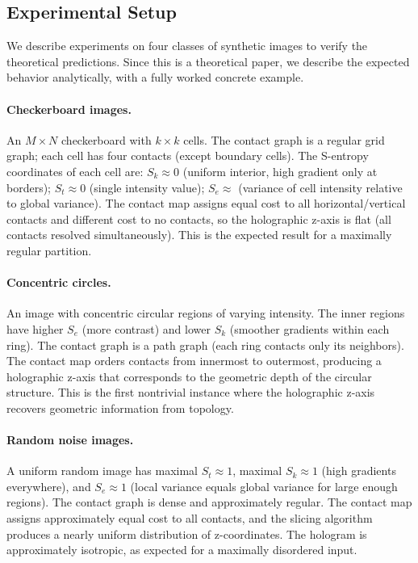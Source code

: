 \documentclass[twocolumn]{article}
\theoremstyle{plain}
\theoremstyle{definition}
\newcommand{\Sk}{S_k}
\newcommand{\St}{S_t}
\newcommand{\Se}{S_e}
\begin{document}
\subsection{Experimental Setup}

We describe experiments on four classes of synthetic images to verify the
theoretical predictions. Since this is a theoretical paper, we describe the
expected behavior analytically, with a fully worked concrete example.

\paragraph{Checkerboard images.} An $M \times N$ checkerboard with $k \times k$
cells. The contact graph is a regular grid graph; each cell has four contacts
(except boundary cells). The S-entropy coordinates of each cell are:
$\Sk \approx 0$ (uniform interior, high gradient only at borders); $\St \approx 0$
(single intensity value); $\Se \approx$ (variance of cell intensity relative to
global variance). The contact map assigns equal cost to all horizontal/vertical
contacts and different cost to no contacts, so the holographic z-axis is flat
(all contacts resolved simultaneously). This is the expected result for a
maximally regular partition.

\paragraph{Concentric circles.} An image with concentric circular regions of
varying intensity. The inner regions have higher $\Se$ (more contrast) and lower
$\Sk$ (smoother gradients within each ring). The contact graph is a path graph
(each ring contacts only its neighbors). The contact map orders contacts from
innermost to outermost, producing a holographic z-axis that corresponds to the
geometric depth of the circular structure. This is the first nontrivial instance
where the holographic z-axis recovers geometric information from topology.

\paragraph{Random noise images.} A uniform random image has maximal $\St \approx 1$,
maximal $\Sk \approx 1$ (high gradients everywhere), and $\Se \approx 1$ (local
variance equals global variance for large enough regions). The contact graph is
dense and approximately regular. The contact map assigns approximately equal
cost to all contacts, and the slicing algorithm produces a nearly uniform
distribution of z-coordinates. The hologram is approximately isotropic, as
expected for a maximally disordered input.
\end{document}
